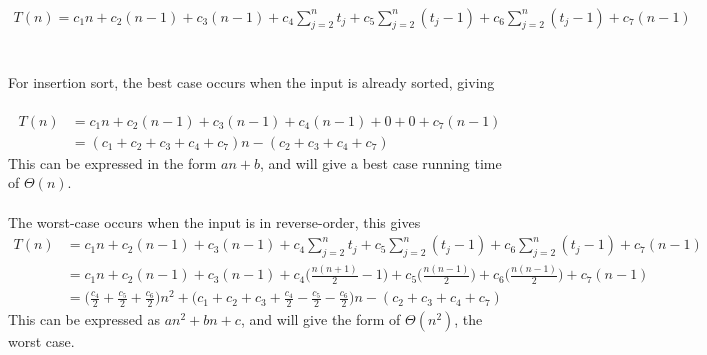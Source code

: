 \documentclass[12pt]{article}
\begin{document}
\\
\begin{multline*}
T(n) = c_1n + c_2(n-1) + c_3(n-1) + c_4\sum_{j=2}^{n} t_j + c_5\sum_{j=2}^{n} (t_j-1) + c_6\sum_{j=2}^{n} (t_j-1) + c_7(n-1)
\end{multline*}
\\
\\
For insertion sort, the best case occurs when the input is already sorted, giving
\\
\\
\begin{equation*}
\begin{split}
T(n) & = c_1n + c_2(n-1) + c_3(n-1) + c_4(n-1) + 0 + 0 + c_7(n-1) \\
  & = (c_1 + c_2 + c_3 + c_4 + c_7)n - (c_2 + c_3 + c_4 + c_7)
\end{split}
\end{equation*}
This can be expressed in the form $an + b$, and will give a best case running time of $\Theta(n)$.
\\
\\
The worst-case occurs when the input is in reverse-order, this gives
\begin{equation*}
\begin{split}
T(n) & = c_1n + c_2(n-1) + c_3(n-1) + c_4\sum_{j=2}^{n} t_j + c_5\sum_{j=2}^{n} (t_j-1) + c_6\sum_{j=2}^{n} (t_j-1) + c_7(n-1) \\
  & = c_1n + c_2(n-1) + c_3(n-1) + c_4\bigg(\frac{n(n+1)}{2} - 1 \bigg) + c_5\bigg(\frac{n(n-1)}{2}\bigg) + c_6\bigg(\frac{n(n-1)}{2}\bigg) + c_7(n-1) \\
  & = \bigg(\frac{c_4}{2} + \frac{c_5}{2} + \frac{c_6}{2}\bigg)n^2 + \bigg(c_1 + c_2 + c_3 + \frac{c_4}{2} - \frac{c_5}{2} - \frac{c_6}{2}\bigg)n - (c_2 + c_3 + c_4 + c_7)
\end{split}
\end{equation*}
This can be expressed as $an^2 + bn + c$, and will give the form of $\Theta(n^2)$, the worst case.
\end{document}
